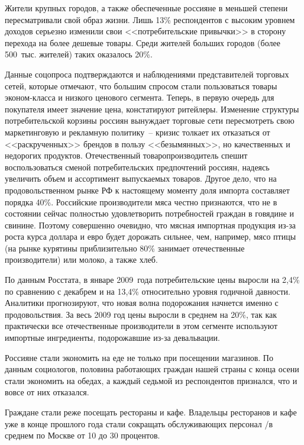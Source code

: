   Жители крупных городов, а также обеспеченные россияне в меньшей степени
  пересматривали свой образ жизни. Лишь 13\% респондентов с высоким уровнем
  доходов серьезно изменили свои <<потребительские привычки>> в сторону перехода
  на более дешевые товары. Среди жителей больших городов (более 500~тыс.
  жителей) таких оказалось 20\%.
  
  Данные соцопроса подтверждаются и наблюдениями представителей торговых сетей,
  которые отмечают, что большим спросом стали пользоваться товары эконом-класса
  и низкого ценового сегмента. Теперь, в первую очередь для покупателя имеет
  значение цена, констатируют ритейлеры. Изменение структуры потребительской
  корзины россиян вынуждает торговые сети пересмотреть свою маркетинговую и
  рекламную политику~-- кризис толкает их отказаться от <<раскрученных>> брендов
  в пользу <<безымянных>>, но качественных и недорогих продуктов. Отечественный
  товаропроизводитель спешит воспользоваться сменой потребительских предпочтений
  россиян, надеясь увеличить объем и ассортимент выпускаемых товаров. Другое
  дело, что на продовольственном рынке РФ к настоящему моменту доля импорта
  составляет порядка 40\%. Российские производители мяса честно признаются, что
  не в состоянии сейчас полностью удовлетворить потребностей граждан в говядине
  и свинине. Поэтому совершенно очевидно, что мясная импортная продукция из-за
  роста курса доллара и евро будет дорожать сильнее, чем, например, мясо птицы
  (на рынке курятины приблизительно 80\% занимает отечественные производители)
  или молоко, а также хлеб.
  
  По данным Росстата, в январе 2009~года потребительские цены выросли на 2,4\%
  по сравнению с декабрем и на 13,4\% относительно уровня годичной давности.
  Аналитики прогнозируют, что новая волна подорожания начнется именно с
  продовольствия. За весь 2009 год цены выросли в среднем на 20\%, так как
  практически все отечественные производители в этом сегменте используют
  импортные ингредиенты, подорожавшие из-за девальвации.
  
  Россияне стали экономить на еде не только при посещении магазинов. По данным
  социологов, половина работающих граждан нашей страны с конца осени стали
  экономить на обедах, а каждый седьмой из респондентов признался, что и вовсе
  от них отказался.
  
  Граждане стали реже посещать рестораны и кафе. Владельцы ресторанов и кафе уже
  в конце прошлого года стали сокращать обслуживающих персонал /в среднем по
  Москве от 10 до 30 процентов.
  
